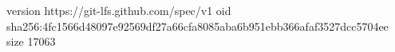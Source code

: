 version https://git-lfs.github.com/spec/v1
oid sha256:4fc1566d48097e92569df27a66cfa8085aba6b951ebb366afaf3527dcc5704ee
size 17063
